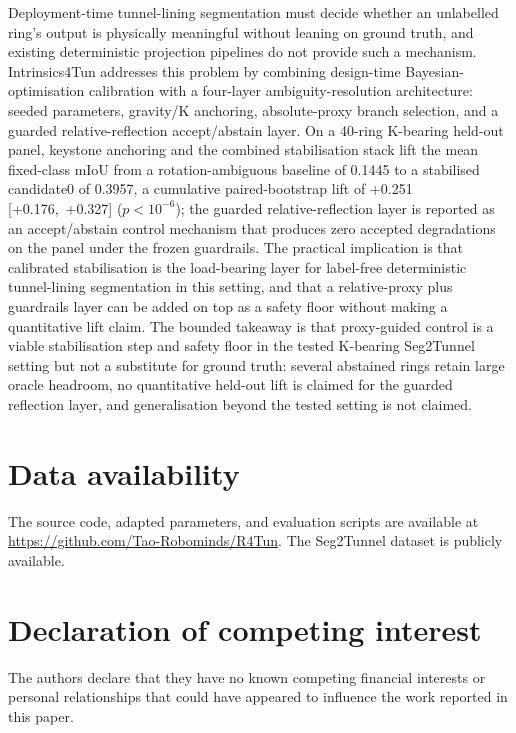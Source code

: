 \documentclass[a4paper,fleqn]{cas-dc}
\begin{document}
Deployment-time tunnel-lining segmentation must decide whether an unlabelled ring's output is physically meaningful without leaning on ground truth, and existing deterministic projection pipelines do not provide such a mechanism. Intrinsics4Tun addresses this problem by combining design-time Bayesian-optimisation calibration with a four-layer ambiguity-resolution architecture: seeded parameters, gravity/K anchoring, absolute-proxy branch selection, and a guarded relative-reflection accept/abstain layer. On a 40-ring K-bearing held-out panel, keystone anchoring and the combined stabilisation stack lift the mean fixed-class mIoU from a rotation-ambiguous baseline of 0.1445 to a stabilised candidate0 of 0.3957, a cumulative paired-bootstrap lift of +0.251 [+0.176,~+0.327] ($p<10^{-6}$); the guarded relative-reflection layer is reported as an accept/abstain control mechanism that produces zero accepted degradations on the panel under the frozen guardrails. The practical implication is that calibrated stabilisation is the load-bearing layer for label-free deterministic tunnel-lining segmentation in this setting, and that a relative-proxy plus guardrails layer can be added on top as a safety floor without making a quantitative lift claim. The bounded takeaway is that proxy-guided control is a viable stabilisation step and safety floor in the tested K-bearing Seg2Tunnel setting but not a substitute for ground truth: several abstained rings retain large oracle headroom, no quantitative held-out lift is claimed for the guarded reflection layer, and generalisation beyond the tested setting is not claimed.


\section*{Data availability}

The source code, adapted parameters, and evaluation scripts are available at \url{https://github.com/Tao-Robominds/R4Tun}. The Seg2Tunnel dataset is publicly available.

\section*{Declaration of competing interest}

The authors declare that they have no known competing financial interests or personal relationships that could have appeared to influence the work reported in this paper.
\end{document}

